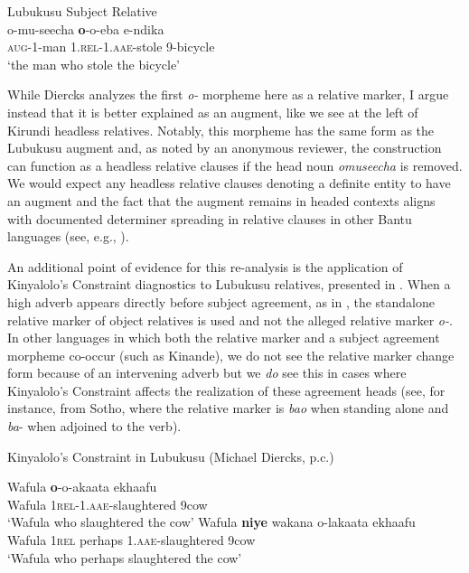 \documentclass[output=paper,colorlinks,citecolor=brown
]{langscibook}
\begin{document}
\ea \label{ex:myers:lubukusu2} Lubukusu Subject Relative \citep[115]{Diercks:2010} \\
\gll o-mu-seecha {\bfseries  o}-o-eba e-ndika\\
\textsc{aug}-1-man 1.\textsc{rel}-\textsc{1.aae}-stole 9-bicycle\\
\glt `the man who stole the bicycle'
\z

While Diercks analyzes the first \textit{o-} morpheme here as a relative marker, I argue instead that it is better explained as an augment, like we see at the left of Kirundi headless relatives. Notably, this morpheme has the same form as the Lubukusu augment and, as noted by an anonymous reviewer, the construction can function as a headless relative clauses if the head noun \emph{omuseecha} is removed. We would expect any headless relative clauses denoting a definite entity to have an augment and the fact that the augment remains in headed contexts aligns with documented determiner spreading in relative clauses in other Bantu languages (see, e.g., \citealt{SchneiderZioga:2007,Asiimweetal:2023}).


An additional point of evidence for this re-analysis is the application of Kinyalolo's Constraint diagnostics to Lubukusu relatives, presented in . When a high adverb appears directly before subject agreement, as in , the standalone relative marker of object relatives is used and not the alleged relative marker \emph{o-}. In other languages in which both the relative marker and a subject agreement morpheme co-occur (such as Kinande), we do not see the relative marker change form because of an intervening adverb but we \emph{do} see this in cases where Kinyalolo's Constraint affects the realization of these agreement heads (see, for instance,  from Sotho, where the relative marker is \emph{bao} when standing alone and \emph{ba}- when adjoined to the verb).

\ea \label{ex:myers:lub4} Kinyalolo's Constraint in Lubukusu (Michael Diercks, p.c.)
\begin{xlist}
\ex \gll Wafula {\bfseries  o}-o-akaata ekhaafu\\
Wafula \textsc{1rel}-\textsc{1.aae}-slaughtered 9cow\\
\glt `Wafula who slaughtered the cow' \label{ex:myers:pc1}
\ex \gll Wafula {\bfseries  niye} wakana o-lakaata ekhaafu\\
Wafula \textsc{1rel} perhaps \textsc{1.aae}-slaughtered 9cow\\
\glt `Wafula who perhaps slaughtered the cow' \label{ex:myers:pc2}
\end{xlist}
\z
\end{document}
